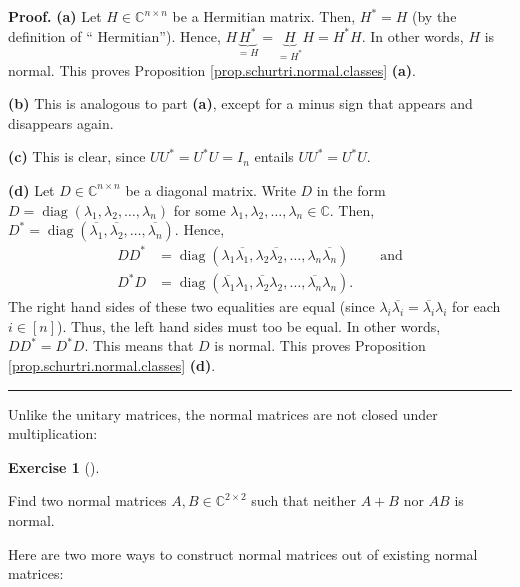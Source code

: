 \documentclass[numbers=enddot,12pt,final,onecolumn,notitlepage]{scrartcl}%
\newcounter{exer}
\numberwithin{exer}{subsection}
\theoremstyle{definition}
\newtheorem{exmp}[exer]{Exercise}
\newenvironment{exercise}[1][]
{\begin{exmp}[#1]\begin{leftbar}}
{\end{leftbar}\end{exmp}}
\newenvironment{proof}[1][Proof]{\noindent\textbf{#1.} }{\ \rule{0.5em}{0.5em}}
\begin{document}
\begin{proof}
\textbf{(a)} Let $H\in\mathbb{C}^{n\times n}$ be a Hermitian matrix. Then,
$H^{\ast}=H$ (by the definition of \textquotedblleft
Hermitian\textquotedblright). Hence, $H\underbrace{H^{\ast}}_{=H}%
=\underbrace{H}_{=H^{\ast}}H=H^{\ast}H$. In other words, $H$ is normal. This
proves Proposition \ref{prop.schurtri.normal.classes} \textbf{(a)}.

\textbf{(b)} This is analogous to part \textbf{(a)}, except for a minus sign
that appears and disappears again.

\textbf{(c)} This is clear, since $UU^{\ast}=U^{\ast}U=I_{n}$ entails
$UU^{\ast}=U^{\ast}U$.

\textbf{(d)} Let $D\in\mathbb{C}^{n\times n}$ be a diagonal matrix. Write $D$
in the form $D=\operatorname*{diag}\left(  \lambda_{1},\lambda_{2}%
,\ldots,\lambda_{n}\right)  $ for some $\lambda_{1},\lambda_{2},\ldots
,\lambda_{n}\in\mathbb{C}$. Then, $D^{\ast}=\operatorname*{diag}\left(
\overline{\lambda_{1}},\overline{\lambda_{2}},\ldots,\overline{\lambda_{n}%
}\right)  $. Hence,
\begin{align*}
DD^{\ast}  &  =\operatorname*{diag}\left(  \lambda_{1}\overline{\lambda_{1}%
},\lambda_{2}\overline{\lambda_{2}},\ldots,\lambda_{n}\overline{\lambda_{n}%
}\right)  \ \ \ \ \ \ \ \ \ \ \text{and}\\
D^{\ast}D  &  =\operatorname*{diag}\left(  \overline{\lambda_{1}}\lambda
_{1},\overline{\lambda_{2}}\lambda_{2},\ldots,\overline{\lambda_{n}}%
\lambda_{n}\right)  .
\end{align*}
The right hand sides of these two equalities are equal (since $\lambda
_{i}\overline{\lambda_{i}}=\overline{\lambda_{i}}\lambda_{i}$ for each
$i\in\left[  n\right]  $). Thus, the left hand sides must too be equal. In
other words, $DD^{\ast}=D^{\ast}D$. This means that $D$ is normal. This proves
Proposition \ref{prop.schurtri.normal.classes} \textbf{(d)}.
\end{proof}

Unlike the unitary matrices, the normal matrices are not closed under multiplication:

\begin{exercise}
\label{exe.schurtri.normal.not-additive} Find two normal matrices
$A,B\in\mathbb{C}^{2\times2}$ such that neither $A+B$ nor $AB$ is normal.
\end{exercise}

Here are two more ways to construct normal matrices out of existing normal matrices:
\end{document}
